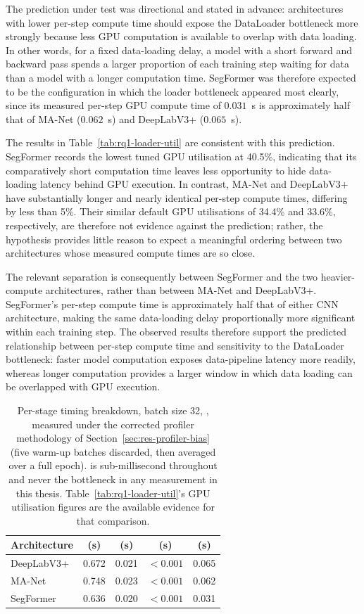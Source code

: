The prediction under test was directional and stated in advance: architectures with lower per-step compute time should expose the DataLoader bottleneck more strongly because less GPU computation is available to overlap with data loading. In other words, for a fixed data-loading delay, a model with a short forward and backward pass spends a larger proportion of each training step waiting for data than a model with a longer computation time. SegFormer was therefore expected to be the configuration in which the loader bottleneck appeared most clearly, since its measured per-step GPU compute time of $0.031$~s is approximately half that of MA-Net ($0.062$~s) and DeepLabV3+ ($0.065$~s).

The results in Table~\ref{tab:rq1-loader-util} are consistent with this prediction. SegFormer records the lowest tuned GPU utilisation at 40.5\%, indicating that its comparatively short computation time leaves less opportunity to hide data-loading latency behind GPU execution. In contrast, MA-Net and DeepLabV3+ have substantially longer and nearly identical per-step compute times, differing by less than 5\%. Their similar default GPU utilisations of 34.4\% and 33.6\%, respectively, are therefore not evidence against the prediction; rather, the hypothesis provides little reason to expect a meaningful ordering between two architectures whose measured compute times are so close.

The relevant separation is consequently between SegFormer and the two heavier-compute architectures, rather than between MA-Net and DeepLabV3+. SegFormer's per-step compute time is approximately half that of either CNN architecture, making the same data-loading delay proportionally more significant within each training step. The observed results therefore support the predicted relationship between per-step compute time and sensitivity to the DataLoader bottleneck: faster model computation exposes data-pipeline latency more readily, whereas longer computation provides a larger window in which data loading can be overlapped with GPU execution.


\begin{table}[!ht]
\centering
\begin{tabular}{lcccc}
\toprule
Architecture & \Tdata{} (s) & \Tdecode{} (s) & \Thtod{} (s) & \Tgpu{} (s) \\
\midrule
DeepLabV3+ & 0.672 & 0.021 & $<0.001$ & 0.065 \\
MA-Net     & 0.748 & 0.023 & $<0.001$ & 0.062 \\
SegFormer  & 0.636 & 0.020 & $<0.001$ & 0.031 \\
\bottomrule
\end{tabular}
\caption[Per-stage timing breakdown by architecture]{Per-stage timing breakdown, batch size 32, , measured
under the corrected profiler methodology of Section~\ref{sec:res-profiler-bias}
(five warm-up batches discarded, then averaged over a full epoch). \Thtod{} is
sub-millisecond throughout and never the bottleneck in any measurement in this
thesis. Table~\ref{tab:rq1-loader-util}'s GPU
utilisation figures are the available evidence for that comparison.}
\label{tab:rq1-breakdown}
\end{table}

